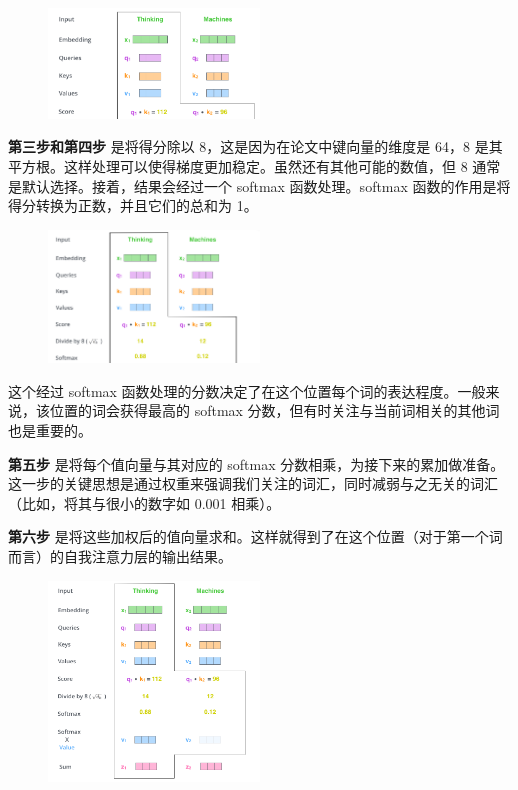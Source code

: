 \documentclass[cn,hazy,blue,10pt,normal]{elegantnote}
\begin{document}
\begin{figure}[htbp]
	\centering
	\includegraphics[width=0.5\textwidth]{image/transformer_self_attention_score.png}
\end{figure}

\textbf{第三步和第四步} 是将得分除以 8，这是因为在论文中键向量的维度是 64，8 是其平方根。这样处理可以使得梯度更加稳定。虽然还有其他可能的数值，但 8 通常是默认选择。接着，结果会经过一个 softmax 函数处理。softmax 函数的作用是将得分转换为正数，并且它们的总和为 1。

\begin{figure}[htbp]
	\centering
	\includegraphics[width=0.5\textwidth]{image/self-attention_softmax.png}
\end{figure}

这个经过 softmax 函数处理的分数决定了在这个位置每个词的表达程度。一般来说，该位置的词会获得最高的 softmax 分数，但有时关注与当前词相关的其他词也是重要的。

\textbf{第五步} 是将每个值向量与其对应的 softmax 分数相乘，为接下来的累加做准备。这一步的关键思想是通过权重来强调我们关注的词汇，同时减弱与之无关的词汇（比如，将其与很小的数字如 0.001 相乘）。

\textbf{第六步} 是将这些加权后的值向量求和。这样就得到了在这个位置（对于第一个词而言）的自我注意力层的输出结果。

\begin{figure}[ht]
	\centering
	\includegraphics[width=0.5\textwidth]{image/self-attention-output.png}
\end{figure}
\end{document}

